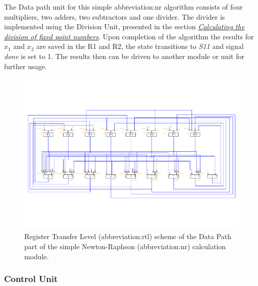 \documentclass[a4paper, twoside, 11pt]{article}
\newcommand{\fbar}{\FloatBarrier}
\begin{document}
            The Data path unit for this simple \gls{abbreviation:nr} algorithm consists of four multipliers, two adders, two subtractors and one divider. The divider is implemented using the Division Unit, presented in the section \hyperref[sec:calculating-the-division-of-fixed-point-numbers]{\textit{Calculating the division of fixed point numbers}}. Upon completion of the algorithm the results for $x_1$ and $x_2$ are saved in the R1 and R2, the state transitions to \textit{S11} and signal \textit{done} is set to 1. The results then can be driven to another module or unit for further usage.
            \begin{figure}[htbp!]
                \centering
                \includegraphics[width=1\textwidth]{src/pdf/simple-nr-rtl.pdf}
                \caption{Register Transfer Level (\gls{abbreviation:rtl}) scheme of the Data Path part of the simple Newton-Raphson (\gls{abbreviation:nr}) calculation module.}
                \label{fig:simple-nr-rtl}
                \end{figure}

        \fbar
        \subsubsection{Control Unit}\label{subsubsec:simple-nr-control-unit}
\end{document}
